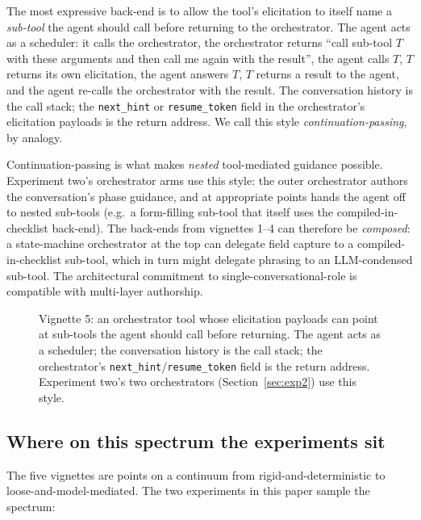 \documentclass[11pt,a4paper]{article}
\begin{document}
The most expressive back-end is to allow the tool's elicitation to itself name a \emph{sub-tool} the agent should call before returning to the orchestrator. The agent acts as a scheduler: it calls the orchestrator, the orchestrator returns ``call sub-tool $T$ with these arguments and then call me again with the result'', the agent calls $T$, $T$ returns its own elicitation, the agent answers $T$, $T$ returns a result to the agent, and the agent re-calls the orchestrator with the result. The conversation history is the call stack; the \texttt{next\_hint} or \texttt{resume\_token} field in the orchestrator's elicitation payloads is the return address. We call this style \emph{continuation-passing}, by analogy.

Continuation-passing is what makes \emph{nested} tool-mediated guidance possible. Experiment two's orchestrator arms use this style: the outer orchestrator authors the conversation's phase guidance, and at appropriate points hands the agent off to nested sub-tools (e.g.\ a form-filling sub-tool that itself uses the compiled-in-checklist back-end). The back-ends from vignettes 1--4 can therefore be \emph{composed}: a state-machine orchestrator at the top can delegate field capture to a compiled-in-checklist sub-tool, which in turn might delegate phrasing to an LLM-condensed sub-tool. The architectural commitment to single-conversational-role is compatible with multi-layer authorship.

\begin{figure}[htbp]
  \centering
  \resizebox{\linewidth}{!}{}
  \caption{Vignette 5: an orchestrator tool whose elicitation payloads can
  point at sub-tools the agent should call before returning. The agent acts
  as a scheduler; the conversation history is the call stack; the orchestrator's
  \texttt{next\_hint}/\texttt{resume\_token} field is the return address.
  Experiment two's two orchestrators (Section~\ref{sec:exp2}) use this style.}
  \label{fig:tool-internals-orchestrator}
\end{figure}

\subsection{Where on this spectrum the experiments sit}

The five vignettes are points on a continuum from rigid-and-deterministic to loose-and-model-mediated. The two experiments in this paper sample the spectrum:
\end{document}
